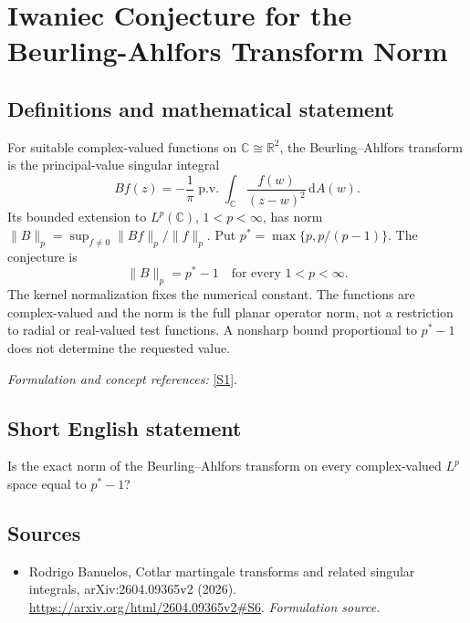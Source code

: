 \documentclass[11pt]{article}
\begin{document}
\section*{\texorpdfstring{Iwaniec Conjecture for the Beurling-Ahlfors Transform Norm}{Iwaniec Conjecture for the Beurling-Ahlfors Transform Norm}}\label{30006881}
\subsection{Definitions and mathematical statement}
For suitable complex-valued functions on ${\mathbb{C}}\cong{\mathbb{R}}^2$, the Beurling--Ahlfors transform is the principal-value singular integral
\[
 Bf(z)=-\frac1\pi\operatorname{p.v.}\int_{{\mathbb{C}}}
 \frac{f(w)}{(z-w)^2}{\,\mathrm{d}} A(w).
\]
Its bounded extension to $L^p({\mathbb{C}})$, $1<p<\infty$, has norm $\|B\|_p=\sup_{f\ne0}\|Bf\|_p/\|f\|_p$. Put $p^*=\max\{p,p/(p-1)\}$. The conjecture is
\[
 \|B\|_p=p^*-1\quad\text{for every }1<p<\infty.
\]
The kernel normalization fixes the numerical constant. The functions are complex-valued and the norm is the full planar operator norm, not a restriction to radial or real-valued test functions. A nonsharp bound proportional to $p^*-1$ does not determine the requested value.
\par\smallskip\textit{Formulation and concept references:} \href{https://arxiv.org/html/2604.09365v2#S6}{[S1]}.

\subsection{Short English statement}
Is the exact norm of the Beurling--Ahlfors transform on every complex-valued $L^p$ space equal to $p^*-1$?
\subsection{Sources}
\begin{itemize}
\item[S1]Rodrigo Banuelos, Cotlar martingale transforms and related singular integrals, arXiv:2604.09365v2 (2026).
\url{https://arxiv.org/html/2604.09365v2#S6}.
\textit{Formulation source.}
\end{itemize}
\end{document}
